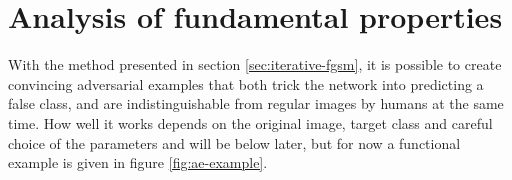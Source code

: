 \documentclass[11pt, a4paper]{article}
\begin{document}














\section{Analysis of fundamental properties}
With the method presented in section \ref{sec:iterative-fgsm}, it is possible to create convincing adversarial examples that both trick the network into predicting a false class, and are indistinguishable from regular images by humans at the same time. How well it works depends on the original image, target class and careful choice of the parameters and will be below later, but for now a functional example is given in figure \ref{fig:ae-example}.
\end{document}
